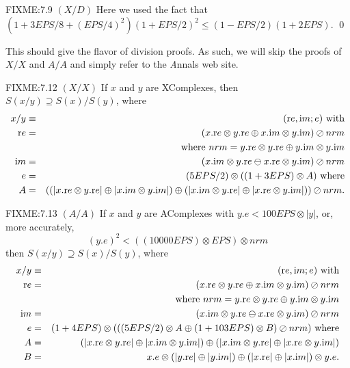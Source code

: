 \begin{definition}
\begin{proposition}{FIXME:7.9 $(X / D)$}
Here we used the fact that 
\hfill $(1 + 3EPS/8 + (EPS/4)^2)(1+EPS/2)^2 \le (1 - EPS/2)(1+ 2EPS).$ \hfill\qed
{}
 
This should give the flavor of division proofs.  As such, we will skip the proofs of $X/X$ and $A/A$ and simply refer to the
 {\textit Annals} web site.
\begin{proposition}{FIXME:7.12 $(X / X)$}
If $x$ and $y$ are {\textrm XComplexes,} then
$S(x / y) \supseteq S(x) / S(y)${\textrm ,} where
\begin{eqnarray*}
x  / y  &\equiv& ({\mathrm re},{\mathrm im};e)\hbox{ with}\\
{\mathrm re}& =& (x.{\mathrm re} \otimes y.{\mathrm re} \oplus x.{\mathrm im} \otimes y.{\mathrm im}) \oslash nrm\\
&&\hbox{ where $nrm = y.{\mathrm
re}
\otimes y.{\mathrm re} \oplus y.{\mathrm im} \otimes y.{\mathrm im}$}\\
{\mathrm im}& = &(x.{\mathrm im} \otimes y.{\mathrm re} \ominus x.{\mathrm re} \otimes y.{\mathrm im}) \oslash nrm\\
e& =& (5EPS/2) \otimes ((1
+  3EPS) \otimes A) \hbox{  where}\\
 A& =& 
((|x.{\mathrm re} \otimes y.{\mathrm re}| \oplus |x.{\mathrm im} \otimes y.{\mathrm im}|)
 \oplus 
 (|x.{\mathrm im} \otimes y.{\mathrm re}| \oplus |x.{\mathrm re} \otimes y.{\mathrm im}|))
\oslash nrm
.\end{eqnarray*}
\end{proposition}

\begin{proposition}{FIXME:7.13 $(A / A)$}
If $x$ and $y$ are {\textrm AComplexes} with 
$y.e < 100 EPS \otimes |y|${\textrm ,} or{\textrm ,} more accurately{\textrm ,}
$$(y.e)^2< ((10000 EPS) \otimes EPS)\otimes nrm$$ then
$S(x / y) \supseteq S(x) / S(y)${\textrm ,} where
\begin{eqnarray*}
x  / y & \equiv& ({\mathrm re},{\mathrm im};e)\hbox{ with}\\
{\mathrm re}& =& (x.{\mathrm re} \otimes y.{\mathrm re} \oplus x.{\mathrm im} \otimes y.{\mathrm im}) \oslash nrm\\
&&\hbox{ where $nrm = y.{\mathrm
re}
\otimes y.{\mathrm re} \oplus y.{\mathrm im} \otimes y.{\mathrm im}$}\\
{\mathrm im}& =& (x.{\mathrm im} \otimes y.{\mathrm re} \ominus x.{\mathrm re} \otimes y.{\mathrm im}) \oslash nrm\\
e& =& (1 + 4EPS)\otimes 
(
((5 EPS/2) \otimes A \oplus (1+103EPS) \otimes B)
\oslash nrm)\hbox{ where}\\
 A& =& (|x.{\mathrm re} \otimes y.{\mathrm re}| \oplus |x.{\mathrm im}\otimes y.{\mathrm im}|) 
 \oplus
(|x.{\mathrm im} \otimes y.{\mathrm re}| \oplus | x.{\mathrm re} \otimes y.{\mathrm im}|)\\
B& =& x.e\otimes(|y.{\mathrm re}|\oplus|y.{\mathrm im}|)
\oplus
   (|x.{\mathrm re}|\oplus|x.{\mathrm im}|)\otimes y.e.
\end{eqnarray*}
\end{proposition}


\end{proposition}
\end{definition}
